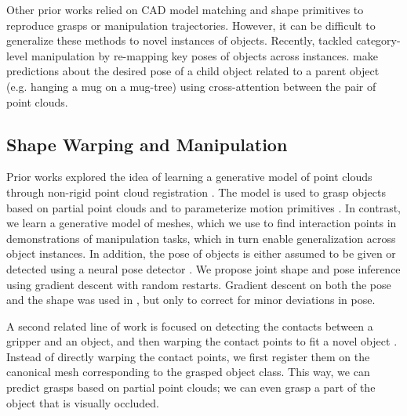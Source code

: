 \documentclass{article}
\begin{document}
Other prior works relied on CAD model matching \cite{klank09realtime,brook11collaborative,beetz11robotic,jakel12learning} and shape primitives \cite{miller03automatic} to reproduce grasps or manipulation trajectories. However, it can be difficult to generalize these methods to novel instances of objects. Recently, \citet{wen22you} tackled category-level manipulation by re-mapping key poses of objects across instances. \citet{pan22taxpose} make predictions about the desired pose of a child object related to a parent object (e.g. hanging a mug on a mug-tree) using cross-attention \cite{vaswani17attention} between the pair of point clouds.

\subsection{Shape Warping and Manipulation}

Prior works explored the idea of learning a generative model of point clouds through non-rigid point cloud registration \cite{rodriguez18transferring,rodriguez18transferringa,klamt18supervised,thompson21shapebased}. The model is used to grasp objects based on partial point clouds \cite{rodriguez18transferring,rodriguez18transferringa,klamt18supervised} and to parameterize motion primitives \cite{thompson21shapebased}. In contrast, we learn a generative model of meshes, which we use to find interaction points in demonstrations of manipulation tasks, which in turn enable generalization across object instances. In addition, the pose of objects is either assumed to be given \cite{thompson21shapebased} or detected using a neural pose detector \cite{klamt18supervised}. We propose joint shape and pose inference using gradient descent with random restarts. Gradient descent on both the pose and the shape was used in \cite{rodriguez18transferring,rodriguez18transferringa}, but only to correct for minor deviations in pose. %

A second related line of work is focused on detecting the contacts between a gripper and an object, and then warping the contact points to fit a novel object \cite{li07datadriven,benamor12generalization,hillenbrand12transferring,jakel12learning,stouraitis15functional,rodriguez18learning,pavlichenko19autonomous,tian19transferring}. Instead of directly warping the contact points, we first register them on the canonical mesh corresponding to the grasped object class. This way, we can predict grasps based on partial point clouds; we can even grasp a part of the object that is visually occluded. %
\end{document}
